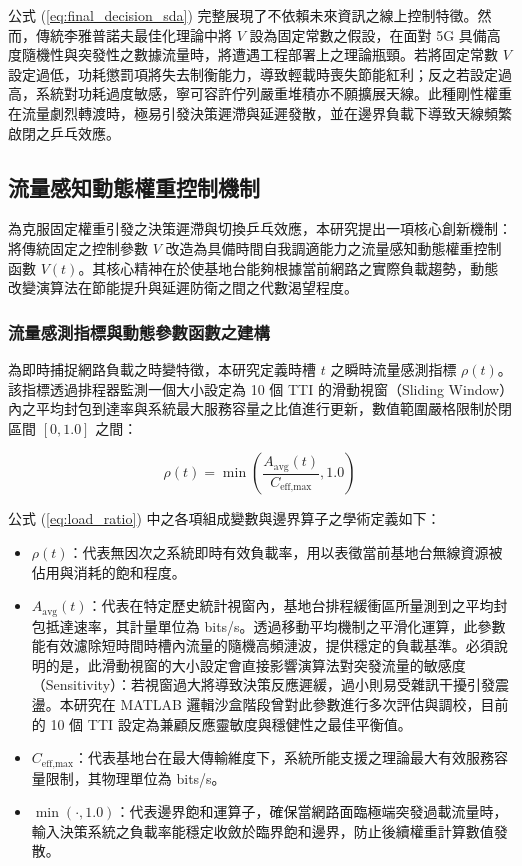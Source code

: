 公式 (\ref{eq:final_decision_sda}) 完整展現了不依賴未來資訊之線上控制特徵。然而，傳統李雅普諾夫最佳化理論中將 $V$ 設為固定常數之假設，在面對 5G 具備高度隨機性與突發性之數據流量時，將遭遇工程部署上之理論瓶頸。若將固定常數 $V$ 設定過低，功耗懲罰項將失去制衡能力，導致輕載時喪失節能紅利；反之若設定過高，系統對功耗過度敏感，寧可容許佇列嚴重堆積亦不願擴展天線。此種剛性權重在流量劇烈轉渡時，極易引發決策遲滯與延遲發散，並在邊界負載下導致天線頻繁啟閉之乒乓效應。

\subsection{流量感知動態權重控制機制}
\label{sec:traffic_aware_v_control}

為克服固定權重引發之決策遲滯與切換乒乓效應，本研究提出一項核心創新機制：將傳統固定之控制參數 $V$ 改造為具備時間自我調適能力之流量感知動態權重控制函數 $V(t)$。其核心精神在於使基地台能夠根據當前網路之實際負載趨勢，動態改變演算法在節能提升與延遲防衛之間之代數渴望程度。

\subsubsection{流量感測指標與動態參數函數之建構}
為即時捕捉網路負載之時變特徵，本研究定義時槽 $t$ 之瞬時流量感測指標 $\rho(t)$。該指標透過排程器監測一個大小設定為 10 個 TTI 的滑動視窗（Sliding Window）內之平均封包到達率與系統最大服務容量之比值進行更新，數值範圍嚴格限制於閉區間 $[0, 1.0]$ 之間：

\begin{equation}
    \rho(t) = \min \left( \frac{A_{\text{avg}}(t)}{C_{\text{eff,max}}}, 1.0 \right)
    \label{eq:load_ratio}
\end{equation}

公式 (\ref{eq:load_ratio}) 中之各項組成變數與邊界算子之學術定義如下：
\begin{itemize}
    \item $\rho(t)$：代表無因次之系統即時有效負載率，用以表徵當前基地台無線資源被佔用與消耗的飽和程度。
    \item $A_{\text{avg}}(t)$：代表在特定歷史統計視窗內，基地台排程緩衝區所量測到之平均封包抵達速率，其計量單位為 bits/s。透過移動平均機制之平滑化運算，此參數能有效濾除短時間時槽內流量的隨機高頻漣波，提供穩定的負載基準。必須說明的是，此滑動視窗的大小設定會直接影響演算法對突發流量的敏感度（Sensitivity）：若視窗過大將導致決策反應遲緩，過小則易受雜訊干擾引發震盪。本研究在 MATLAB 邏輯沙盒階段曾對此參數進行多次評估與調校，目前的 10 個 TTI 設定為兼顧反應靈敏度與穩健性之最佳平衡值。
    \item $C_{\text{eff,max}}$：代表基地台在最大傳輸維度下，系統所能支援之理論最大有效服務容量限制，其物理單位為 bits/s。
    \item $\min(\cdot, 1.0)$：代表邊界飽和運算子，確保當網路面臨極端突發過載流量時，輸入決策系統之負載率能穩定收斂於臨界飽和邊界，防止後續權重計算數值發散。
\end{itemize}


